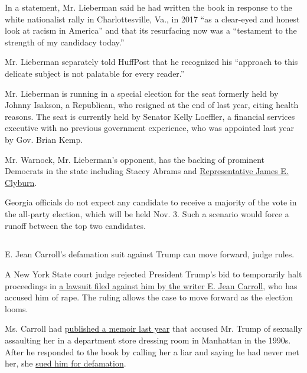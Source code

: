 In a statement, Mr. Lieberman said he had written the book in response
to the white nationalist rally in Charlottesville, Va., in 2017 ``as a
clear-eyed and honest look at racism in America'' and that its
resurfacing now was a ``testament to the strength of my candidacy
today.''

Mr. Lieberman separately told HuffPost that he recognized his ``approach
to this delicate subject is not palatable for every reader.''

Mr. Lieberman is running in a special election for the seat formerly
held by Johnny Isakson, a Republican, who resigned at the end of last
year, citing health reasons. The seat is currently held by Senator Kelly
Loeffler, a financial services executive with no previous government
experience, who was appointed last year by Gov. Brian Kemp.

Mr. Warnock, Mr. Lieberman's opponent, has the backing of prominent
Democrats in the state including Stacey Abrams and
\href{https://www.ajc.com/blog/politics/georgia-senate-warnock-wins-clyburn-endorsement/6lcWvKZ34cxFHqIvCpGDYL/}{Representative
James E. Clyburn}.

Georgia officials do not expect any candidate to receive a majority of
the vote in the all-party election, which will be held Nov. 3. Such a
scenario would force a runoff between the top two candidates.

\hypertarget{section-10}{%
\subsection{}\label{section-10}}

E. Jean Carroll's defamation suit against Trump can move forward, judge
rules.

A New York State court judge rejected President Trump's bid to
temporarily halt proceedings in
\href{https://www.nytimes3xbfgragh.onion/2020/08/07/nyregion/jean-caroll-donald-trump-lawsuit-rape.html}{a
lawsuit filed against him by the writer E. Jean Carroll}, who has
accused him of rape. The ruling allows the case to move forward as the
election looms.

Ms. Carroll had
\href{https://www.nytimes3xbfgragh.onion/2019/06/21/books/e-jean-carroll-trump.html}{published
a memoir last year} that accused Mr. Trump of sexually assaulting her in
a department store dressing room in Manhattan in the 1990s. After he
responded to the book by calling her a liar and saying he had never met
her, she
\href{https://www.nytimes3xbfgragh.onion/2019/11/04/nyregion/jean-carroll-sues-trump.html}{sued
him for defamation}.

